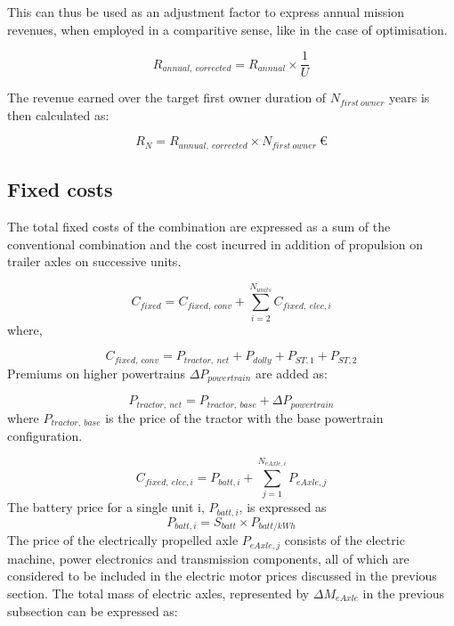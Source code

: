 \documentclass[ExampleMasters.tex]{subfiles}
\begin{document}
		This can thus be used as an adjustment factor to express annual mission revenues, when employed in a comparitive sense, like in the case of optimisation.

		\begin{equation}
			R_{annual,\ corrected} = R_{annual} \times \frac{1}{U}
		\end{equation}

		The revenue earned over the target first owner duration of $N_{first\ owner}$ years is then calculated as:

		\begin{equation}
			R_{N} = R_{annual,\ corrected} \times N_{first\ owner} \  \euro
		\end{equation}

		\subsection{Fixed costs}

			The total fixed costs of the combination are expressed as a sum of the conventional combination and the cost incurred in addition of propulsion on trailer axles on successive units.

			\begin{equation}
				C_{fixed} = C_{fixed,\ conv}+ \displaystyle \sum_{i=2}^{N_{units}} C_{fixed,\ elec, i}
			\end{equation}
			where,

			\begin{equation}
				C_{fixed,\ conv} = P_{tractor,\ net}+P_{dolly}+P_{ST,1}+P_{ST,2}
			\end{equation}
			Premiums on higher powertrains $\Delta P_{powertrain}$ are added as:
			
			\begin{equation}
				P_{tractor,\ net} = P_{tractor,\ base} + \Delta P_{powertrain}
			\end{equation}
			where $P_{tractor,\ base}$ is the price of the tractor with the base powertrain configuration. 

			\begin{equation}
				C_{fixed,\ elec, i} = P_{batt,i}+\displaystyle \sum_{j=1}^{N_{eAxle,i}} P_{eAxle,j}
			\end{equation}
			The battery price for a single unit i, $P_{batt,i}$, is expressed as
			\begin{equation}
				P_{batt,i}= S_{batt} \times P_{batt/kWh}
			\end{equation}
			The price of the electrically propelled axle $P_{eAxle,j}$ consists of the electric machine, power electronics and transmission components, all of which are considered to be included in the electric motor prices discussed in the previous section. The total mass of electric axles, represented by $\Delta M_{eAxle}$ in the previous subsection can be expressed as:
\end{document}
